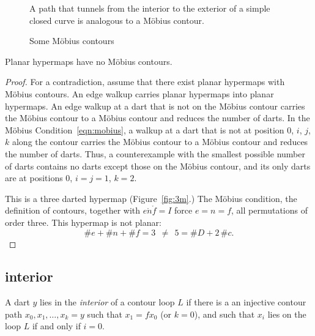 \begin{figure}[htb]
  \centering
  \caption{A path that tunnels from the interior to the exterior
   of a simple closed curve
   is analogous to a M\"obius contour.}
  \label{fig:violate-jct}
\end{figure}

\begin{figure}[htb]
  \centering
  \caption{Some M\"obius contours}
  \label{fig:mobius-contour}
\end{figure}






\begin{lemma}
Planar hypermaps have no M\"obius contours.
\end{lemma}

\begin{proof} For a contradiction, assume that there exist planar
hypermaps with M\"obius contours.  An edge walkup carries
planar hypermaps into planar hypermaps. An edge walkup
at a dart that is not on the M\"obius contour carries the
M\"obius contour to a M\"obius contour 
and reduces the number of darts.  
In the M\"obius Condition~\ref{eqn:mobius},
a walkup at a dart that is not at position $0$, $i$, $j$, $k$
along the contour carries the M\"obius contour to a M\"obius contour
and reduces the number of darts. Thus, a counterexample with
the smallest possible number of darts contains no
darts except those on the M\"obius contour, and its only darts
are at positions $0$, $i=j=1$, $k=2$.

This is a three darted hypermap (Figure~\ref{fig:3m}.)  
The M\"obius condition, the
definition of contours, together with $e\ocirc n\ocirc f=I$ force
$e=n=f$, all permutations of order three.  This hypermap is not planar:
    $$\# e + \# n + \# f = 3~~\ne~~ 5 = \# D + 2\, \#c.$$
\end{proof}



\subsection{interior}

\begin{definition}[interior]\label{def:interior} 
A dart $y$ lies in the {\it interior} of a contour
loop $L$ if there is a an injective contour path
$x_0,x_1,\ldots,x_k=y$ such that $x_1 = f x_0$ (or $k=0$), and
such that $x_i$ lies on the loop $L$ if and only if $i=0$.
\end{definition}

